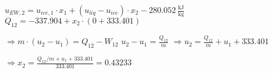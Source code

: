 \( u_{EW,2} = u_{ice,1} \cdot x_1 + (u_{liq} - u_{ice}) \cdot x_2 - 280.052 \, \frac{\text{kJ}}{\text{kg}} \)  
\( Q_{12} = -337.904 + x_2 \cdot (0 + 333.401) \)  

\( \Rightarrow m \cdot (u_2 - u_1) = Q_{12} - W_{12} \)  
\( u_2 - u_1 = \frac{Q_{12}}{m} \)  
\( \Rightarrow u_2 = \frac{Q_{12}}{m} + u_1 + 333.401 \)  

\( \Rightarrow x_2 = \frac{Q_{12} / m + u_1 + 333.401}{333.401} = 0.43233 \)